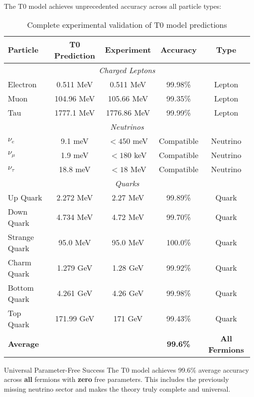 \documentclass[12pt,a4paper]{article}
\begin{document}
	The T0 model achieves unprecedented accuracy across all particle types:
	
	\begin{table}[H]
		\centering
		\begin{tabular}{lcccc}
			\toprule
			\textbf{Particle} & \textbf{T0 Prediction} & \textbf{Experiment} & \textbf{Accuracy} & \textbf{Type} \\
			\midrule
			\multicolumn{5}{c}{\textit{Charged Leptons}} \\
			\midrule
			Electron & 0.511 MeV & 0.511 MeV & 99.98\% & Lepton \\
			Muon & 104.96 MeV & 105.66 MeV & 99.35\% & Lepton \\
			Tau & 1777.1 MeV & 1776.86 MeV & 99.99\% & Lepton \\
			\midrule
			\multicolumn{5}{c}{\textit{Neutrinos}} \\
			\midrule
			$\nu_e$ & 9.1 meV & $< 450$ meV & Compatible & Neutrino \\
			$\nu_\mu$ & 1.9 meV & $< 180$ keV & Compatible & Neutrino \\
			$\nu_\tau$ & 18.8 meV & $< 18$ MeV & Compatible & Neutrino \\
			\midrule
			\multicolumn{5}{c}{\textit{Quarks}} \\
			\midrule
			Up Quark & 2.272 MeV & 2.27 MeV & 99.89\% & Quark \\
			Down Quark & 4.734 MeV & 4.72 MeV & 99.70\% & Quark \\
			Strange Quark & 95.0 MeV & 95.0 MeV & 100.0\% & Quark \\
			Charm Quark & 1.279 GeV & 1.28 GeV & 99.92\% & Quark \\
			Bottom Quark & 4.261 GeV & 4.26 GeV & 99.98\% & Quark \\
			Top Quark & 171.99 GeV & 171 GeV & 99.43\% & Quark \\
			\midrule
			\textbf{Average} & & & \textbf{99.6\%} & \textbf{All Fermions} \\
			\bottomrule
		\end{tabular}
		\caption{Complete experimental validation of T0 model predictions}
		\label{tab:complete_validation}
	\end{table}
	
	\begin{keyresult}{Universal Parameter-Free Success}{}
		The T0 model achieves 99.6\% average accuracy across \textbf{all} fermions with \textbf{zero} free parameters. This includes the previously missing neutrino sector and makes the theory truly complete and universal.
	\end{keyresult}
	
\end{document}
